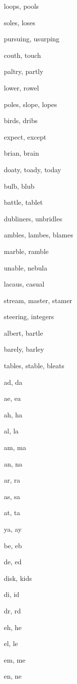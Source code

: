     \item loops, pools
    \item soles, loses
    \item pursuing, usurping
    \item couth, touch
    \item paltry, partly
    \item lower, rowel
    \item poles, slope, lopes
    \item birds, dribs
    \item expect, except
    \item brian, brain
    \item doaty, toady, today
    \item bulb, blub
    \item battle, tablet
    \item dubliners, unbridles
    \item ambles, lambes, blames
    \item marble, ramble
    \item unable, nebula
    \item lacaus, casual
    \item stream, master, stamer
    \item steering, integers
    \item albert, bartle
    \item barely, barley
    \item tables, stable, bleats
    \item ad, da
    \item ae, ea
    \item ah, ha
    \item al, la
    \item am, ma
    \item an, na
    \item ar, ra
    \item as, sa
    \item at, ta
    \item ya, ay
    \item be, eb
    \item de, ed
    \item disk, kids
    \item di, id
    \item dr, rd
    \item eh, he
    \item el, le
    \item em, me
    \item en, ne
